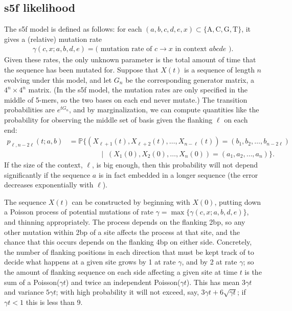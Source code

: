\documentclass{article}
\renewcommand{\P}{\mathbb{P}}
\newcommand{\nA}{\mbox{A}}  %
\newcommand{\nC}{\mbox{C}}
\newcommand{\nG}{\mbox{G}}
\newcommand{\nT}{\mbox{T}}
\newcommand{\given}{\;\mid\;}
\theoremstyle{plain}
\theoremstyle{definition}
\begin{document}
\subsection{s5f likelihood}

The s5f model is defined as follows:
for each $(a,b,c,d,e,x) \subset \{\nA,\nC,\nG,\nT\}$,
it gives a (relative) mutation rate
\begin{align}
    \gamma(c,x;a,b,d,e) = \text{( mutation rate of $c \to x$ in context $abcde$ )} .
\end{align}
Given these rates, the only unknown parameter is the total amount of time
that the sequence has been mutated for.
Suppose that $X(t)$ is a sequence of length $n$ evolving under this model,
and let $G_n$ be the corresponding generator matrix,
a $4^n \times 4^n$ matrix.
(In the s5f model, the mutation rates are only specified in the middle of 5-mers,
so the two bases on each end never mutate.)
The transition probabilities are $e^{tG_n}$,
and by marginalization,
we can compute quantities like
the probability for observing the middle set of basis
given the flanking $\ell$ on each end:
\begin{align}
    p_{\ell,n-2\ell}(t;a,b)
    &=
    \P\{
        (X_{\ell+1}(t), X_{\ell+2}(t), \ldots, X_{n-\ell}(t))=(b_1,b_2,\ldots,b_{n-2\ell}) \\
    &\qquad \qquad
        \given (X_{1}(0), X_{2}(0), \ldots, X_{n}(0))=(a_1,a_2,\ldots,a_{n})
    \} .
\end{align}
If the size of the context, $\ell$, is big enough,
then this probability will not depend significantly if the sequence $a$ is in fact embedded in a longer sequence
(the error decreases exponentially with $\ell$).

The sequence $X(t)$ can be constructed by beginning with $X(0)$,
putting down a Poisson process of potential mutations of rate $\gamma = \max\{\gamma(c,x;a,b,d,e)\}$,
and thinning appropriately.
The process depends on the flanking 2bp,
so any other mutation within 2bp of a site affects the process at that site,
and the chance that this occurs depends on the flanking 4bp on either side.
Concretely, the number of flanking positions in each direction
that must be kept track of to decide what happens at a given site
grows by 1 at rate $\gamma$, and by 2 at rate $\gamma$;
so the amount of flanking sequence on each side affecting a given site at time $t$
is the sum of a Poisson($\gamma t$) and twice an independent Poisson($\gamma t$).
This has mean $3\gamma t$ and variance $5 \gamma t$;
with high probability it will not exceed, say,
$3\gamma t + 6 \sqrt{\gamma t}$;
if $\gamma t < 1$ this is less than 9.
\end{document}
